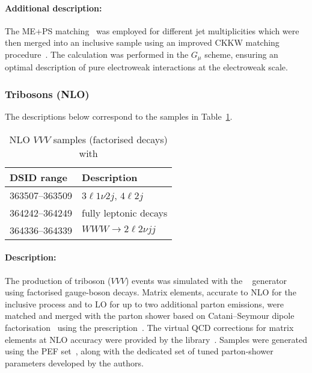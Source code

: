 \paragraph{Additional description:}

The ME+PS matching~\cite{Hoeche:2011fd} was employed for different jet
multiplicities which were then merged into an inclusive sample using an improved CKKW matching
procedure~\cite{Catani:2001cc,Hoeche:2009rj}. 
The calculation was performed in the $G_\mu$ scheme, ensuring an optimal 
description of pure electroweak interactions at the electroweak scale.





\subsubsection{Tribosons (NLO)}

The descriptions below correspond to the samples in
Table~\ref{tab:MB-sherpa-vvvnlo}.

\begin{table}[htbp]
  \begin{center}
    \caption{NLO $VVV$ samples (factorised decays) with \SHERPA }
    \label{tab:MB-sherpa-vvvnlo}
    \begin{tabular}{ l | l }
      \hline
      DSID range & Description \\
      \hline
      363507--363509   & $3\ell1\nu2j$, $4\ell2j$\\
      364242--364249   & fully leptonic decays\\
      364336--364339   & $WWW\to 2\ell2\nu jj$\\
      \hline
    \end{tabular}
  \end{center}
\end{table}

\paragraph{Description:}

The production of triboson ($VVV$) events was simulated with the 
\SHERPA[2.2.2]~\cite{Bothmann:2019yzt} generator using factorised gauge-boson decays. 
Matrix elements, accurate to NLO for the inclusive process and to LO for up to 
two additional parton emissions, were matched and merged with the \SHERPA parton 
shower based on Catani--Seymour dipole factorisation~\cite{Gleisberg:2008fv,Schumann:2007mg} 
using the \MEPSatNLO prescription~\cite{Hoeche:2011fd,Hoeche:2012yf,Catani:2001cc,Hoeche:2009rj}. 
The virtual QCD corrections for matrix elements at NLO accuracy were 
provided by the \OPENLOOPS library~\cite{Buccioni:2019sur,Cascioli:2011va,Denner:2016kdg}.
Samples were generated using the \NNPDF[3.0nnlo] PEF set~\cite{Ball:2014uwa}, along with
the dedicated set of tuned parton-shower parameters developed by the \SHERPA authors.

